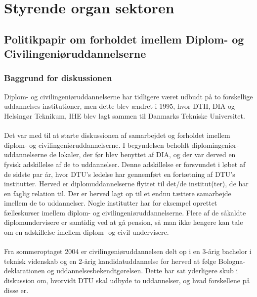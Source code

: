 \section{Styrende organ sektoren}

\subsection{Politikpapir om forholdet imellem Diplom- og Civilingeniøruddannelserne}
\subsubsection{Baggrund for diskussionen}
Diplom- og civilingeniøruddannelserne har tidligere været udbudt på to forskellige uddannelses-institutioner, men dette blev ændret i 1995, hvor DTH, DIA og Helsingør Teknikum, IHE blev lagt sammen til Danmarks Tekniske Universitet.\\
\\
Det var med til at starte diskussionen af samarbejdet og forholdet imellem diplom- og civilingeniøruddannelserne. I begyndelsen beholdt diplomingeniør-uddannelserne de lokaler, der før blev benyttet af DIA, og der var derved en fysisk adskillelse af de to uddannelser. Denne adskillelse er forsvundet i løbet af de sidste par år, hvor DTU’s ledelse har gennemført en fortætning af DTU’s institutter. Herved er diplomuddannelserne flyttet til det/de institut(ter), de har en faglig relation til. Der er herved lagt op til et endnu tættere samarbejde imellem de to uddannelser. Nogle institutter har for eksempel oprettet fælleskurser imellem diplom- og civilingeniøruddannelserne. Flere af de såkaldte diplomundervisere er samtidig ved at gå pension, så man ikke længere kan tale om en adskillelse imellem diplom- og civil undervisere.\\
\\
Fra sommeroptaget 2004 er civilingeniøruddannelsen delt op i en 3-årig bachelor i teknisk videnskab og en 2-årig kandidatuddannelse for herved at følge Bologna-deklarationen og uddannelsesbekendtgørelsen. Dette har sat yderligere skub i diskussion om, hvorvidt DTU skal udbyde to uddannelser, og hvad forskellene på disse er.

